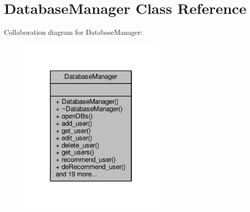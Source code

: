 \hypertarget{classDatabaseManager}{}\section{Database\+Manager Class Reference}
\label{classDatabaseManager}


Collaboration diagram for Database\+Manager\+:\nopagebreak
\begin{figure}[H]
\begin{center}
\leavevmode
\includegraphics[width=202pt]{db/d36/classDatabaseManager__coll__graph}
\end{center}
\end{figure}
